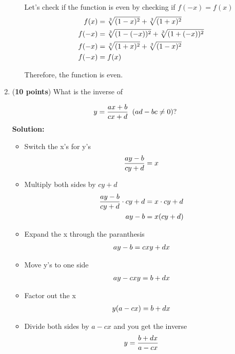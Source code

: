 \documentclass[a4paper]{article}
\begin{document}
\begin{enumerate}
\begin{enumerate}
	Let's check if the function is even by checking if $f(-x) = f(x)$\\
	\begin{align}
		f(x) &= \sqrt[3]{(1-x)^2} + \sqrt[3]{(1+x)^2} \notag\\
		f(-x) &= \sqrt[3]{(1 - (-x))^2} + \sqrt[3]{(1 + (-x))^2} \notag\\
		f(-x) &= \sqrt[3]{(1 + x)^2} + \sqrt[3]{(1 - x)^2} \notag\\
		f(-x) &= f(x) \notag
	\end{align}	
	
	
	Therefore, the function is even.


\end{enumerate}


\item (\textbf{10 points}) What is the inverse of 

\begin{equation}
	y = \frac{ax + b}{cx + d} \; \; (ad - bc \neq 0)? \notag
\end{equation}
\textbf{Solution:}\\

\begin{itemize}
	\item Switch the x's for y's
	\begin{align*}
	\frac{ay - b}{cy + d} = x \notag\\
	\end{align*}	
	\item Multiply both sides by $cy+d$
	\begin{align*}
	\frac{ay - b}{cy + d} \cdot cy + d &= x  \cdot cy + d\notag\\
	ay -b &= x(cy+d)\notag
	\end{align*}
	\item Expand the x through the paranthesis
	\begin{align*}
	ay-b = cxy + dx\notag
	\end{align*}
	\item Move y's to one side
	\begin{align*}
	ay-cxy = b + dx\notag
	\end{align*}
	\item Factor out the x
	\begin{align*}
	y(a - cx) = b + dx\notag
	\end{align*}
	\item Divide both sides by $a - cx$ and you get the inverse
	\begin{align*}
	y = \frac{b+dx}{a - cx}\notag
	\end{align*}
\end{itemize}



\end{enumerate}
\end{document}
